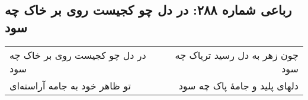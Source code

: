 \begin{center}
\section*{رباعی شماره ۲۸۸: در دل چو کجیست روی بر خاک چه سود}
\label{sec:sh288}
\begin{longtable}{l p{0.5cm} r}
در دل چو کجیست روی بر خاک چه سود
&&
چون زهر به دل رسید تریاک چه سود
\\
تو ظاهر خود به جامه آراسته‌ای
&&
دلهای پلید و جامهٔ پاک چه سود
\\
\end{longtable}
\end{center}
